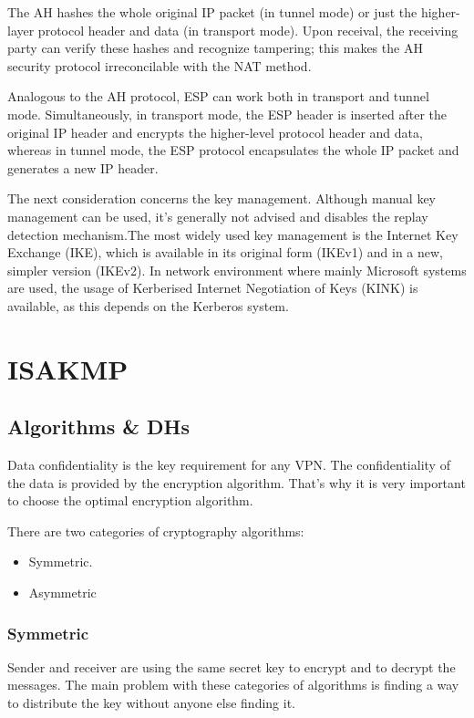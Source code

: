 \documentclass[a4paper]{report}
\begin{document}
The AH hashes the whole original IP packet (in tunnel mode) or just the higher-layer protocol header and data (in transport mode). Upon receival, the receiving party can verify these hashes and recognize tampering; this makes the AH security protocol irreconcilable with the NAT method. \parencite[2-11]{Kent2005AH}

Analogous to the AH protocol, ESP can work both in transport and tunnel mode. Simultaneously, in transport mode, the ESP header is inserted after the original IP header and encrypts the higher-level protocol header and data, whereas in tunnel mode, the ESP protocol encapsulates the whole IP packet and generates a new IP header. \parencite[18-20]{Kent2005ESP}

The next consideration concerns the key management. Although manual key management can be used, it's generally not advised and disables the replay detection mechanism.The most widely used key management is the Internet Key Exchange (IKE), which is available in its original form (IKEv1) and in a new, simpler version (IKEv2). In network environment where mainly Microsoft systems are used, the usage of Kerberised Internet Negotiation of Keys (KINK) is available, as this depends on the Kerberos system. \parencite[4-5]{Bellovin2009}

\section{ISAKMP}
\label{sec:ISAKMP}

\subsection{Algorithms \& DHs}
\label{ssec:AlgoDH}
Data confidentiality is the key requirement for any VPN. The confidentiality of the data is provided by the encryption algorithm. That's why it is very important to choose the optimal encryption algorithm. \parencite{Snader2006}

There are two categories of cryptography algorithms:
\begin{itemize}
	\item Symmetric.
	\item Asymmetric
\end{itemize}

\subsubsection{Symmetric}
\label{sssec:symmetric}
Sender and receiver are using the same secret key to encrypt and to decrypt the messages. The main problem with these categories of algorithms is finding a way to distribute the key without anyone else finding it.
\end{document}
